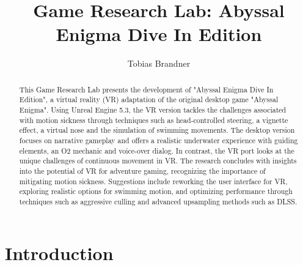 \documentclass[letterpaper, 10 pt, conference]{ieeeconf}  %
\title{\LARGE \bf
Game Research Lab: Abyssal Enigma Dive In Edition
}
\author{Tobias Brandner}
\affil{Julius-Maximilians University \\
        Würzburg, Germany \\
        tobias.brandner@stud-mail.uni-wuerzburg.de}
\begin{document}
\maketitle
\thispagestyle{empty}
\pagestyle{empty}

\BiblatexSplitbibDefernumbersWarningOff

\begin{abstract}

    This Game Research Lab presents the development of "Abyssal Enigma Dive In Edition", a virtual reality (VR) adaptation of the original desktop game "Abyssal Enigma". 
    Using Unreal Engine 5.3, the VR version tackles the challenges associated with motion sickness through techniques such as head-controlled steering, a vignette effect, a virtual nose and the simulation of swimming movements.
    The desktop version focuses on narrative gameplay and offers a realistic underwater experience with guiding elements, an O2 mechanic and voice-over dialog. 
    In contrast, the VR port looks at the unique challenges of continuous movement in VR.
    The research concludes with insights into the potential of VR for adventure gaming, recognizing the importance of mitigating motion sickness. 
    Suggestions include reworking the user interface for VR, exploring realistic options for swimming motion, and optimizing performance through techniques such as aggressive culling and advanced upsampling methods such as DLSS.
    
\end{abstract}


\section{Introduction}
\end{document}
